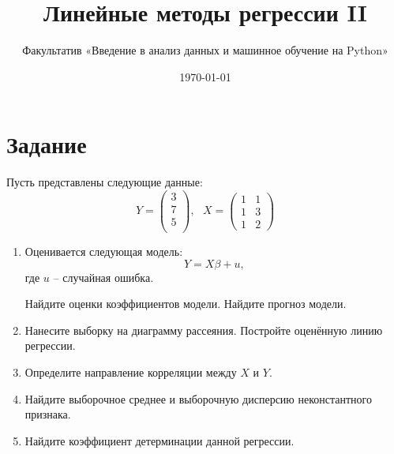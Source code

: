 \documentclass[11pt, a4paper]{extarticle}
\title{Линейные методы регрессии II}
\author{Факультатив «Введение в анализ данных и машинное обучение на Python»}
\date{\today}
\begin{document}
	
	\maketitle
	
\section*{Задание}
Пусть представлены следующие данные:
\[
Y = \begin{pmatrix}
3 \\
7 \\
5 \\
\end{pmatrix}, \text{ } X = \begin{pmatrix}
1 & 1 \\
1 & 3 \\
1 & 2
\end{pmatrix}
\]
\begin{enumerate}[label=\alph*)]
	\item Оценивается следующая модель:
	\[Y = X\beta + u,\]
	где $u$ – случайная ошибка.
	
	Найдите оценки коэффициентов модели. Найдите прогноз модели.
	\item Нанесите выборку на диаграмму рассеяния. Постройте оценённую линию регрессии. 
	\item Определите направление корреляции между $X$ и $Y$.
	\item Найдите выборочное среднее и выборочную дисперсию неконстантного признака.  
	\item Найдите коэффициент детерминации данной регрессии. 
\end{enumerate}


	
\end{document}
